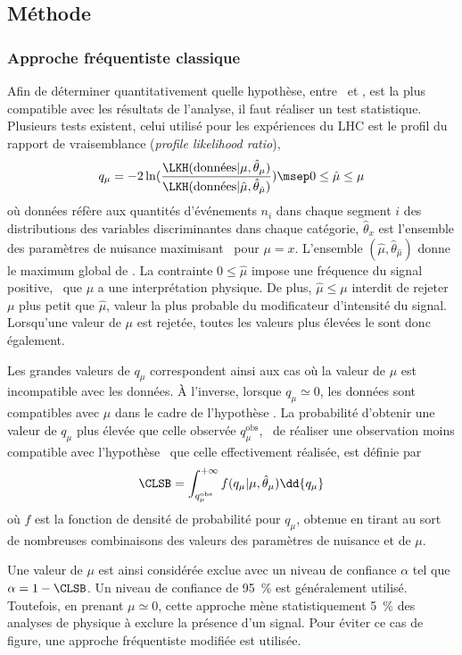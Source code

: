 \subsection{Méthode \CLS}\label{chapter-HTT_analysis-section-signal_extraction-CLS}
\subsubsection{Approche fréquentiste classique}
Afin de déterminer quantitativement quelle hypothèse, entre \hypB\ et \hypSB, est la plus compatible avec les résultats de l'analyse, il faut réaliser un test statistique.
Plusieurs tests existent, celui utilisé pour les expériences du LHC est le profil du rapport de vraisemblance (\emph{profile likelihood ratio}),
\begin{equation}
q_{\mu} = -2 \ln(\frac{\LKH(\text{données} |  \mu, \hat{\theta}_{\mu})}{\LKH(\text{données} |  \hat{\mu}, \hat{\theta}_{\hat{\mu}})})
\msep
0 \leq \hat{\mu} \leq \mu
\end{equation}
où
\og données \fg{} réfère aux quantités d'événements $n_i$ dans chaque segment $i$ des distributions des variables discriminantes dans chaque catégorie,
$\hat{\theta}_x$ est l'ensemble des paramètres de nuisance maximisant \LKH\ pour $\mu=x$.
L'ensemble $(\hat{\mu},\hat{\theta}_{\hat{\mu}})$ donne le maximum global de \LKH.
La contrainte $0 \leq \hat{\mu}$ impose une fréquence du signal positive, \ie\ que $\mu$ a une interprétation physique.
De plus, $\hat{\mu} \leq \mu$ interdit de rejeter $\mu$ plus petit que $\hat{\mu}$, valeur la plus probable du modificateur d'intensité du signal.
Lorsqu'une valeur de $\mu$ est rejetée, toutes les valeurs plus élevées le sont donc également.
\par
Les grandes valeurs de $q_{\mu}$ correspondent ainsi aux cas où la valeur de $\mu$ est incompatible avec les données.
À l'inverse, lorsque $q_{\mu}\simeq0$, les données sont compatibles avec $\mu$ dans le cadre de l'hypothèse \hypSB.
La probabilité d'obtenir une valeur de $q_{\mu}$ plus élevée que celle observée $q_{\mu}^\text{obs}$,
\ie\ de réaliser une observation moins compatible avec l'hypothèse \hypSB\ que celle effectivement réalisée,
est définie par
\begin{equation}
\CLSB = \int_{q_{\mu}^\text{obs}}^{+\infty} f (q_\mu | \mu, \hat{\theta}_\mu) \dd{q_\mu}
\end{equation}
où $f$ est la fonction de densité de probabilité pour $q_{\mu}$, obtenue en tirant au sort de nombreuses combinaisons des valeurs des paramètres de nuisance et de $\mu$.
\par
Une valeur de $\mu$ est ainsi considérée exclue avec un niveau de confiance $\alpha$ tel que
$\alpha = 1 - \CLSB$.
Un niveau de confiance de \SI{95}{\%} est généralement utilisé.
Toutefois, en prenant $\mu\simeq0$, cette approche mène statistiquement \SI{5}{\%} des analyses de physique à exclure la présence d'un signal.
Pour éviter ce cas de figure, une approche fréquentiste modifiée est utilisée.
